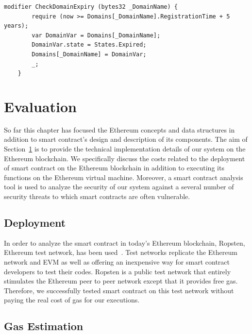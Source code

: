 \begin{lstlisting}[basicstyle=\scriptsize\ttfamily,caption={Implementation of the \emph{CheckDomainExpiry} function modifier in \Ghazalstar smart contract.},label={code:CheckDomainExpiry},float]
modifier CheckDomainExpiry (bytes32 _DomainName) {
        require (now >= Domains[_DomainName].RegistrationTime + 5 years);
        var DomainVar = Domains[_DomainName];
        DomainVar.state = States.Expired;
        Domains[_DomainName] = DomainVar;
        _;
    }
\end{lstlisting}
\section{Evaluation}
\label{sec:Evaluation}
So far this chapter has focused the Ethereum concepts and data structures in addition to \Ghazalstar smart contract's design and description of its components. The aim of Section~\ref{sec:Evaluation} is to provide the technical implementation details of our system on the Ethereum blockchain. We specifically discuss the costs related to the deployment of \Ghazalstar smart contract on the Ethereum blockchain in addition to executing its functions on the Ethereum virtual machine. Moreover, a smart contract analysis tool is used to analyze the security of our system against a several number of security threats to which smart contracts are often vulnerable.


\subsection{Deployment}

In order to analyze the \Ghazalstar smart contract in today's Ethereum blockchain, Ropsten, Ethereum test network, has been used~\cite{GitHubet61:online}. Test networks replicate the Ethereum network and EVM as well as offering an inexpensive way for smart contract developers to test their codes. Ropsten is a public test network that entirely stimulates the Ethereum peer to peer network except that it provides free gas. Therefore, we successfully tested \Ghazalstar smart contract on this test network without paying the real cost of gas for our executions.
\subsection{Gas Estimation}

